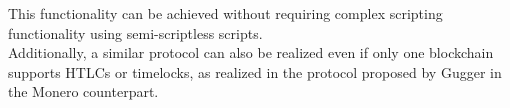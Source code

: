\documentclass{article}      	%
\begin{document}
This functionality can be achieved without requiring complex scripting functionality \cite{h4sh3d} using semi-scriptless scripts. \\
Additionally, a similar protocol can also be realized even if only one blockchain supports HTLCs or timelocks, as realized in the protocol proposed by Gugger \cite{h4sh3d} in the Monero counterpart.


\end{document}
